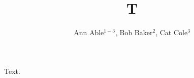 \documentclass[sigconf]{acmart}
\begin{document}
\title{T}
\author{Ann Able$^{1-3}$, Bob Baker$^{2}$, Cat Cole$^{3}$}
\maketitle
Text.
\end{document}
